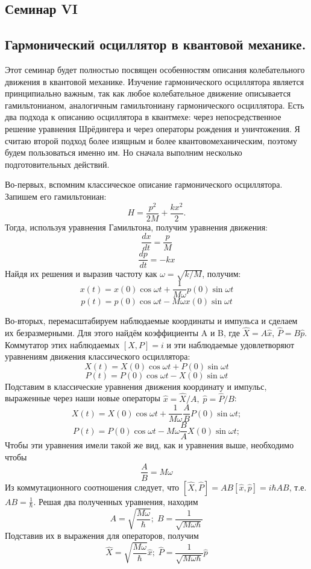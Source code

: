 \begin{center}
    \section{Семинар VI}
\end{center}
\subsection{Гармонический осциллятор в квантовой механике.}
\hspace{1em} Этот семинар будет полностью посвящен особенностям описания колебательного движения в квантовой механике. Изучение гармонического осциллятора является принципиально важным, так как любое колебательное движение описывается гамильтонианом, аналогичным гамильтониану гармонического осциллятора.  Есть два подхода к описанию осциллятора в квантмехе: через непосредственное решение уравнения Шрёдингера и через операторы рождения и уничтожения. Я считаю второй подход более изящным и более квантовомеханическим, поэтому будем пользоваться именно им. Но сначала выполним несколько подготовительных действий. 

Во-первых, вспомним классическое описание гармонического осциллятора. Запишем его гамильтониан:
\[
H = \frac{p^2}{2M} + \frac{kx^2}{2}.
\]
Тогда, используя уравнения Гамильтона, получим уравнения движения:
\[
\frac{dx}{dt} = \frac{p}{M}
\]
\[
\frac{dp}{dt} = -kx
\]
Найдя их решения и выразив частоту как $\omega = \sqrt{k/M}$, получим:
\[
x(t) = x(0)\cos\omega t + \frac{1}{M\omega}p(0)\sin\omega t
\]
\[
p(t) = p(0)\cos \omega t - M\omega x(0) \sin\omega t
\]

Во-вторых, перемасштабируем наблюдаемые координаты и импульса и сделаем их безразмерными. Для этого найдём коэффициенты A и B, где $\hat{X} = A\hat{x}$, $\hat{P} = B\hat{p}$. Коммутатор этих наблюдаемых $\left[X, P \right] = i$  и эти наблюдаемые удовлетворяют уравнениям движения классического осциллятора:
\[
X(t) = X(0)\cos\omega t + P(0)\sin\omega t
\]
\[
P(t) = P(0)\cos \omega t - X(0) \sin\omega t
\]
Подставим в классические уравнения движения координату и импульс, выраженные через наши новые операторы $\hat{x} = \hat{X}/A,\;\hat{p} = \hat{P}/B$:
\[
X(t) = X(0)\cos \omega t + \frac{1}{M\omega}\frac{A}{B}P(0)\sin\omega t;
\]
\[
P(t) = P(0)\cos \omega t - M\omega\frac{B}{A}X(0)\sin\omega t;
\]
Чтобы эти уравнения имели такой же вид, как и уравнения выше, необходимо чтобы
\[
\frac{A}{B} = M\omega
\]
Из коммутационного соотношения следует, что $\left[\hat{X}, \hat{P}\right] = AB\left[\hat{x},\hat{p}\right] = i\hbar AB$, т.е. $AB = \frac{1}{\hbar}$. Решая два полученных уравнения, находим
\[
A = \sqrt{\frac{M\omega}{\hbar}}; \; B = \frac{1}{\sqrt{M\omega \hbar}}
\]
Подставив их в выражения для операторов, получим
\[
\hat{X} = \sqrt{\frac{M\omega}{\hbar}}\hat{x}; \; \hat{P} = \frac{1}{\sqrt{M\omega \hbar}}\hat{p}
\]

